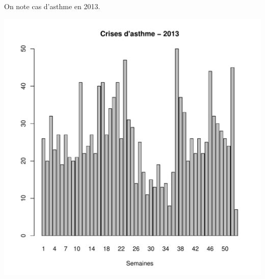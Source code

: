 \documentclass[12pt,english,french,twoside]{book}\usepackage[]{graphicx}\usepackage[]{color}
\makeatletter
\def\maxwidth{ %
  \ifdim\Gin@nat@width>\linewidth
    \linewidth
  \else
    \Gin@nat@width
  \fi
}
\makeatother
\begin{document}
On note  cas d'asthme en 2013.


\includegraphics[width=\maxwidth]{figure/asthme21} 
\end{document}
